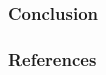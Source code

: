 \documentclass[english, fleqn]{beamer}
\begin{document}

\begin{frame}
    \frametitle{Conclusion}

\end{frame}

\begin{frame}
    \titlepage
\end{frame}

\begin{frame}
    \frametitle{References}

    \nocite{tikz-feynman}

    \printbibliography
\end{frame}
\end{document}
